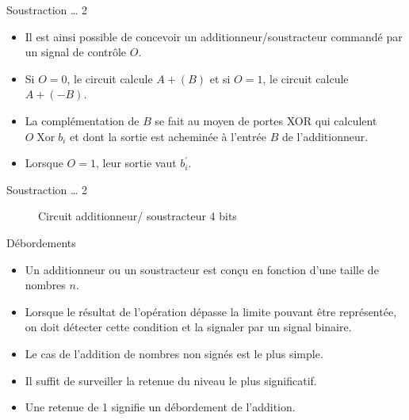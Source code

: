 \documentclass[presentation]{beamer}
\begin{document}
\begin{frame}[label={sec:org3bf0e23}]{Soustraction \ldots{} 2}
\begin{itemize}
\item Il est ainsi possible de concevoir un additionneur/soustracteur commandé par un signal de contrôle \(O\).

\item Si \(O=0\), le circuit calcule \(A + (B)\) et si \(O=1\), le circuit calcule \(A + (-B)\).

\item La complémentation de \(B\) se fait au moyen de portes XOR qui calculent \(O \operatorname{Xor} b_i\) et dont la sortie est acheminée à l'entrée \(B\) de l'additionneur.

\item Lorsque \(O=1\), leur sortie vaut \(b_i^\prime\).
\end{itemize}
\end{frame}

\begin{frame}[label={sec:org9502f42}]{Soustraction \ldots{} 2}
\begin{figure}[htbp]
\centering

\caption{\label{fig:orgc93358d}Circuit additionneur/ soustracteur 4 bits}
\end{figure}
\end{frame}

\begin{frame}[label={sec:orgad33db6}]{Débordements}
\begin{itemize}
\item Un additionneur ou un soustracteur est conçu en fonction d'une taille de nombres \(n\).

\item Lorsque le résultat de l'opération dépasse la limite pouvant être représentée, on doit détecter cette condition et la signaler par un signal binaire.

\item Le cas de l'addition de nombres non signés est le plus simple.

\item Il suffit de surveiller la retenue du niveau le plus significatif.

\item Une retenue de 1 signifie un débordement de l'addition.
\end{itemize}
\end{frame}
\end{document}
